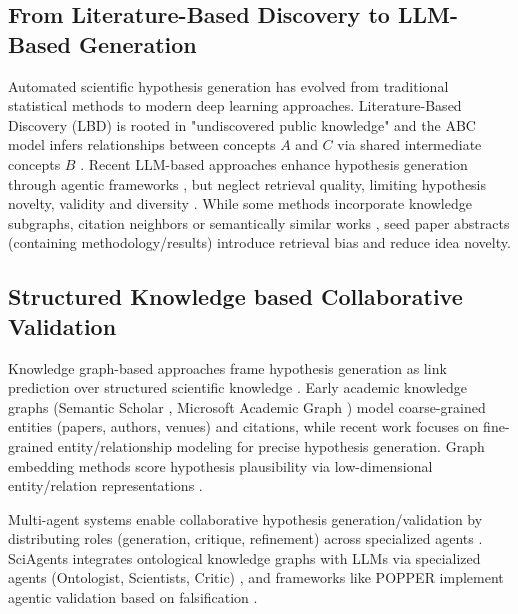 \documentclass[runningheads]{llncs}
\begin{document}
\subsection{From Literature-Based Discovery to LLM-Based Generation}
Automated scientific hypothesis generation has evolved from traditional statistical methods to modern deep learning approaches. Literature-Based Discovery (LBD) is rooted in "undiscovered public knowledge" and the ABC model infers relationships between concepts $A$ and $C$ via shared intermediate concepts $B$ \cite{swanson1986fish,swanson1986undiscovered}. Recent LLM-based approaches enhance hypothesis generation through agentic frameworks \cite{wang2024research,si2024large,baek2025research}, but neglect retrieval quality, limiting hypothesis novelty, validity and diversity \cite{lewis2020retrieval,zhao2024survey,li2024b}. While some methods incorporate knowledge subgraphs, citation neighbors or semantically similar works \cite{wang2024research,li2024b,baek2025research}, seed paper abstracts (containing methodology/results) introduce retrieval bias and reduce idea novelty.


\subsection{Structured Knowledge based Collaborative Validation}
Knowledge graph-based approaches frame hypothesis generation as link prediction over structured scientific knowledge \cite{borrego2025research,de2021discovering}. Early academic knowledge graphs (Semantic Scholar \cite{ammar2018construction}, Microsoft Academic Graph \cite{wang2020microsoft}) model coarse-grained entities (papers, authors, venues) and citations, while recent work focuses on fine-grained entity/relationship modeling \cite{luan2018multi} for precise hypothesis generation. Graph embedding methods score hypothesis plausibility via low-dimensional entity/relation representations \cite{rossi2021knowledge,wang2021survey}.

Multi-agent systems enable collaborative hypothesis generation/validation by distributing roles (generation, critique, refinement) across specialized agents \cite{ghafarollahi2025sciagents,ke2025biodisco}. SciAgents integrates ontological knowledge graphs with LLMs via specialized agents (Ontologist, Scientists, Critic) \cite{ghafarollahi2025sciagents}, and frameworks like POPPER implement agentic validation based on falsification \cite{huang2025automated}.\\
\end{document}
